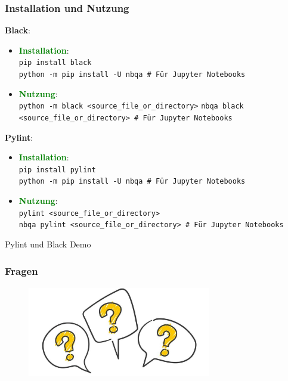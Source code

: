 \documentclass[10pt]{beamer}
\newcommand{\htgreen}[1] {{\bf \textcolor{Green}{#1}}}
\begin{document}
\begin{frame}[fragile]
  \frametitle{Installation und Nutzung}
  {\bf Black}:
  \begin{itemize}
    \item \htgreen{Installation}: \\
      \texttt{pip install black}\\
      \texttt{python -m pip install -U nbqa # Für Jupyter Notebooks}
    \item \htgreen{Nutzung}:\\
      \texttt{python -m black <source_file_or_directory>}
      \texttt{nbqa black <source_file_or_directory> # Für Jupyter Notebooks}
  \end{itemize}
  \vspace{0.5cm}

  {\bf Pylint}:
  \begin{itemize}
    \item \htgreen{Installation}: \\
      \texttt{pip install pylint}  \\
      \texttt{python -m pip install -U nbqa # Für Jupyter Notebooks}
    \item \htgreen{Nutzung}:\\
      \texttt{pylint <source_file_or_directory>}\\
      \texttt{nbqa pylint <source_file_or_directory> # Für Jupyter Notebooks}
  \end{itemize}
\end{frame}

\begin{frame}
    \Huge{\centerline{Pylint und Black Demo}}
\end{frame}


\begin{frame}
  \frametitle{Fragen}
  \begin{figure}
    \centerline{
      \includegraphics[width=8cm, height=4cm]{images/fragen.png}
    }
  \end{figure}
\end{frame}
\end{document}
